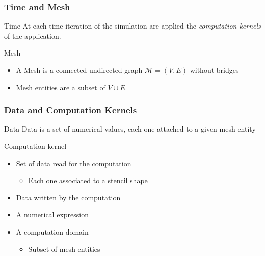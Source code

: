 \documentclass{beamer}
\begin{document}
\begin{frame}
\frametitle{Time and Mesh}
\begin{block}{Time}
At each time iteration of the simulation are applied the \emph{computation kernels} of the application.
\end{block}
\begin{block}{Mesh}
\begin{itemize}
\item A Mesh is a connected undirected graph $\mathcal{M}=(V,E)$ without bridges
\item Mesh entities are a subset of $V \cup E$
\end{itemize}
\end{block}
\begin{center}
\end{center}
\end{frame}

\begin{frame}
\frametitle{Data and Computation Kernels}
\begin{block}{Data}
Data is a set of numerical values, each one attached to a given mesh entity
\end{block}
\begin{block}{Computation kernel}
\begin{itemize}
\item Set of data read for the computation
\begin{itemize}
\item Each one associated to a stencil shape
\end{itemize}
\item Data written by the computation
\item A numerical expression
\item A computation domain
\begin{itemize}
\item Subset of mesh entities
\end{itemize}
\end{itemize}
\end{block}
\end{frame}
\end{document}
